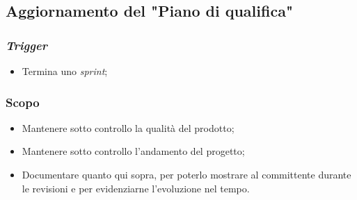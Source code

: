 \subsection{Aggiornamento del "Piano di qualifica"}
\label{aggiornare-pdq}

\subsubsection{\textit{Trigger}}
\begin{itemize}
	\item Termina uno \textit{sprint};
\end{itemize}

\subsubsection{Scopo}
\begin{itemize}
	\item Mantenere sotto controllo la qualità del prodotto;

	\item Mantenere sotto controllo l'andamento del progetto;

	\item Documentare quanto qui sopra, per poterlo mostrare al committente
	      durante le revisioni e per evidenziarne l'evoluzione nel tempo.
\end{itemize}

